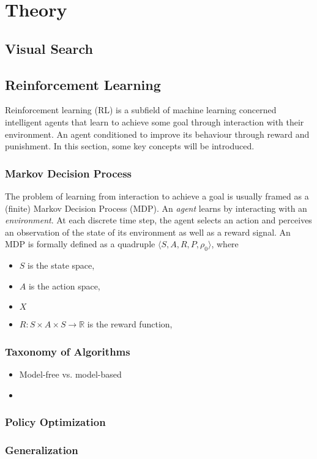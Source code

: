 \chapter{Theory}
\label{cha:theory}

\section{Visual Search}



\section{Reinforcement Learning}

Reinforcement learning (RL) is a subfield of machine learning concerned intelligent agents that learn to achieve some goal through interaction with their environment. An agent conditioned to improve its behaviour through reward and punishment. In this section, some key concepts will be introduced.

\subsection{Markov Decision Process}

The problem of learning from interaction to achieve a goal is usually framed as a (finite) Markov Decision Process (MDP). An \textit{agent} learns by interacting with an \textit{environment}. At each discrete time step, the agent selects an action and perceives an observation of the state of its environment as well as a reward signal. An MDP is formally defined as a quadruple \(\langle S, A, R, P, \rho_0 \rangle\), where

\begin{itemize}
    \item \(S\) is the state space,
    \item \(A\) is the action space,
    \item \(X\)
    \item \(R : S \times A \times S \rightarrow \mathbb{R}\) is the reward function, 
\end{itemize}

\subsection{Taxonomy of Algorithms}

\begin{itemize}
    \item Model-free vs. model-based
    \item 
\end{itemize}


\subsection{Policy Optimization}



\subsection{Generalization}